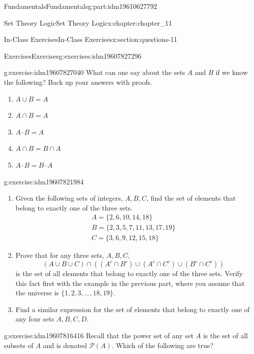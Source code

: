 \documentclass[oneside,10pt,]{book}
\numberwithin{equation}{section}
\begin{document}
\begin{partptx}{Fundamentals}{}{Fundamentals}{}{}{g:part:idm19610627792}
\begin{chapterptx}{Set Theory Logic}{}{Set Theory Logic}{}{}{x:chapter:chapter_11}
\begin{sectionptx}{In-Class Exercises}{}{In-Class Exercises}{}{}{x:section:questions-11}
%
\begin{exercises-subsection-numberless}{Exercises}{}{Exercises}{}{}{g:exercises:idm19607827296}
\par\medskip\noindent%
%
\begin{exercisegroup}
\begin{divisionexerciseeg}{1}{}{}{g:exercise:idm19607827040}%
What can one say about the sets \(A\) and \(B\) if we know the following?  Back up your answers with proofs.%
\begin{enumerate}[label=(\alph*)]
\item{}\(\displaystyle A \cup B = A\)%
\item{}\(\displaystyle A\cap B = A\)%
\item{}\(\displaystyle A–B = A\)%
\item{}\(\displaystyle A\cap B = B\cap A\)%
\item{}\(\displaystyle A–B = B–A\)%
\end{enumerate}
%
\end{divisionexerciseeg}%
\begin{divisionexerciseeg}{2}{}{}{g:exercise:idm19607821984}%
%
\begin{enumerate}[label=(\alph*)]
\item{}Given the following sets of integers, \(A, B, C\), find the set of elements that belong to exactly one of the three sets.%
\begin{gather*}
A=\{2,6,10,14,18\}\\
B=\{2,3,5,7,11,13,17,19\}\\
C=\{3,6,9,12,15,18\}
\end{gather*}
%
\item{}Prove that for any three sets, \(A, B, C\),%
\begin{equation*}
(A \cup B \cup C)\cap ((A^c \cap B^c)\cup (A^c \cap C^c)\cup (B^c \cap C^c))
\end{equation*}
is the set of all elements that belong to exactly one of the three sets.  Verify this fact first with the example in the previous part, where you assume that the universe is \(\{1,2,3,\dots,18,19\}\).%
\item{}Find a similar expression for the set of elements that belong to exactly one of any four sets \(A, B, C, D.\)%
\end{enumerate}
%
\end{divisionexerciseeg}%
\begin{divisionexerciseeg}{3}{}{}{g:exercise:idm19607816416}%
Recall that the power set of any set \(A\) is the set of all subsets of \(A\) and is denoted \(\mathcal{P}(A)\).  Which of the following are true?%

\end{divisionexerciseeg}
\end{exercisegroup}
\end{exercises-subsection-numberless}
\end{sectionptx}
\end{chapterptx}
\end{partptx}
\end{document}

